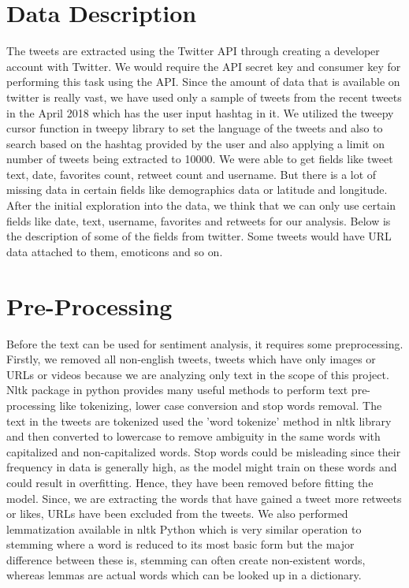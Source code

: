 \section{Data Description}
The tweets are extracted using the Twitter API through creating a developer 
account with Twitter. We would require the API secret key and consumer key for performing 
this task using the API. Since the amount of data that is available on twitter 
is really vast, we have used only a sample of tweets from the recent 
tweets in the April 2018 which has the user input hashtag in it. We utilized the 
tweepy cursor function in tweepy library to set the language of the tweets and 
also to search based on the hashtag provided by the user and also applying a 
limit on number of tweets being extracted to 10000. We were able to get fields 
like tweet text, date, favorites count, retweet count and username. 
But there is a lot of missing data in certain fields like demographics data or 
latitude and longitude. After the initial exploration into the data, we think 
that we can only use certain fields like date, text, username, favorites and 
retweets for our analysis. Below is the description of some of the fields from twitter. 
Some tweets would have URL data attached to them, emoticons and so on.

\section{Pre-Processing}
Before the text can be used for sentiment analysis, it requires some preprocessing. 
Firstly, we removed all non-english tweets, tweets which have only images or URLs 
or videos because we are analyzing only text in the scope of this project. 
Nltk package in python provides many useful methods to perform text pre-processing 
like tokenizing, lower case conversion and stop words removal. The text in the tweets 
are tokenized used the ’word tokenize’ method in nltk library and then converted to 
lowercase to remove ambiguity in the same words with capitalized and non-capitalized words. 
Stop words could be misleading since their frequency in data is generally high, as the model 
might train on these words and could result in overfitting. Hence, they have been removed before 
fitting the model. Since, we are extracting the words that have gained a tweet more 
retweets or likes, URLs have been excluded from the tweets. We also performed 
lemmatization available in nltk Python which is very similar operation to stemming 
where a word is reduced to its most basic form but the major difference between 
these is, stemming can often create non-existent words, whereas lemmas are actual 
words which can be looked up in a dictionary. 

